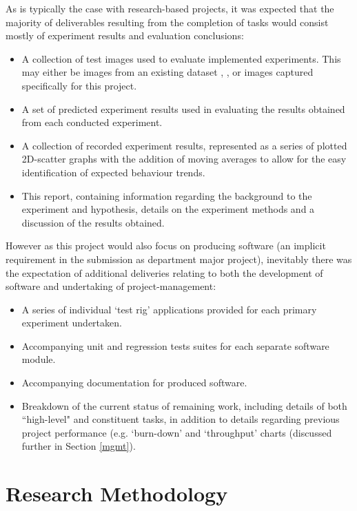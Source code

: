 As is typically the case with research-based projects, it was expected that the majority of deliverables resulting from the completion of tasks would consist mostly of experiment results and evaluation conclusions:

\begin{itemize}
	\item A collection of test images used to evaluate implemented experiments. This may either be images from an existing dataset \cite{ucl-dataset} \cite{baker-dataset}, \cite{mpi-dataset}, or images captured specifically for this project.
	\item A set of predicted experiment results used in evaluating the results obtained from each conducted experiment.
	\item A collection of recorded experiment results, represented as a series of plotted 2D-scatter graphs with the addition of moving averages to allow for the easy identification of expected behaviour trends.
	\item This report, containing information regarding the background to the experiment and hypothesis, details on the experiment methods and a discussion of the results obtained.
 \end{itemize}

However as this project would also focus on producing software (an implicit requirement in the submission as department major project), inevitably there was the expectation of additional deliveries relating to both the development of software and undertaking of project-management:

\begin{itemize}
	\item A series of individual `test rig' applications provided for each primary experiment undertaken.
	\item Accompanying unit and regression tests suites for each separate software module.
	\item Accompanying documentation for produced software.
	\item Breakdown of the current status of remaining work, including details of both ``high-level" and constituent tasks, in addition to details regarding previous project performance (e.g. `burn-down' and `throughput' charts (discussed further in Section \ref{mgmt}).
\end{itemize}

\section{Research Methodology}

